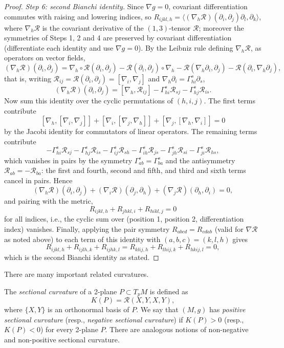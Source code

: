\begin{proof}
\emph{Step 6: second Bianchi identity.} Since $\nabla g=0$,
covariant differentiation commutes with raising and lowering
indices, so
$R_{ijkl,h}=\langle(\nabla_h{\mathcal
R})(\partial_i,\partial_j)\partial_l,\partial_k\rangle$, where
$\nabla_h {\mathcal R}$ is the covariant derivative of the
$(1,3)$-tensor ${\mathcal R}$; moreover the symmetries of Steps 1,
2 and 4 are preserved by covariant differentiation (differentiate
each identity and use $\nabla g=0$). By the Leibniz rule defining
$\nabla_h{\mathcal R}$, as operators on vector fields,
$$(\nabla_h{\mathcal R})(\partial_i,\partial_j)
=\nabla_h\circ{\mathcal R}(\partial_i,\partial_j)
-{\mathcal R}(\partial_i,\partial_j)\circ\nabla_h
-{\mathcal R}(\nabla_h\partial_i,\partial_j)
-{\mathcal R}(\partial_i,\nabla_h\partial_j),$$
that is, writing ${\mathcal R}_{ij}={\mathcal
R}(\partial_i,\partial_j)=[\nabla_i,\nabla_j]$ and
$\nabla_h\partial_i=\Gamma^s_{hi}\partial_s$,
$$(\nabla_h{\mathcal R})(\partial_i,\partial_j)
=[\nabla_h,{\mathcal R}_{ij}]
-\Gamma^s_{hi}{\mathcal R}_{sj}-\Gamma^s_{hj}{\mathcal R}_{is}.$$
Now sum this identity over the cyclic permutations of $(h,i,j)$. The
first terms contribute
$$[\nabla_h,[\nabla_i,\nabla_j]]+[\nabla_i,[\nabla_j,\nabla_h]]
+[\nabla_j,[\nabla_h,\nabla_i]]=0$$
by the Jacobi identity for commutators of linear operators. The
remaining terms contribute
$$-\Gamma^s_{hi}{\mathcal R}_{sj}-\Gamma^s_{hj}{\mathcal R}_{is}
-\Gamma^s_{ij}{\mathcal R}_{sh}-\Gamma^s_{ih}{\mathcal R}_{js}
-\Gamma^s_{jh}{\mathcal R}_{si}-\Gamma^s_{ji}{\mathcal R}_{hs},$$
which vanishes in pairs by the symmetry
$\Gamma^s_{ab}=\Gamma^s_{ba}$ and the antisymmetry ${\mathcal
R}_{ab}=-{\mathcal R}_{ba}$: the first and fourth, second and fifth,
and third and sixth terms cancel in pairs. Hence
$$(\nabla_h{\mathcal R})(\partial_i,\partial_j)
+(\nabla_i{\mathcal R})(\partial_j,\partial_h)
+(\nabla_j{\mathcal R})(\partial_h,\partial_i)=0,$$
and pairing with the metric,
$$R_{ijkl,h}+R_{jhkl,i}+R_{hikl,j}=0$$
for all indices, i.e., the cyclic sum over (position 1, position 2,
differentiation index) vanishes. Finally, applying the pair symmetry
$R_{abcd}=R_{cdab}$ (valid for $\nabla{\mathcal R}$ as noted above)
to each term of this identity with $(a,b,c)=(k,l,h)$ gives
$$R_{ijkl,h}+R_{ijlh,k}+R_{ijhk,l}
=R_{klij,h}+R_{lhij,k}+R_{hkij,l}=0,$$
which is the second Bianchi identity as stated.
\end{proof}


There are many important related curvatures.


\begin{definition}
\label{def:sectional-curvature}
\leanok
The \textit{sectional curvature} of a
2-plane $P\subset T_pM$ is defined as
\[ K(P) = {\mathcal R}(X,Y,X,Y), \]
where $\{X,Y\}$ is an orthonormal basis of $P$. We say that $(M,g)$
has \textit{positive sectional curvature} (resp., \textit{negative
sectional curvature}) if $K(P)>0$ (resp., $K(P)<0$) for every
2-plane $P$.  There are analogous notions of non-negative and
non-positive sectional curvature.
\end{definition}



